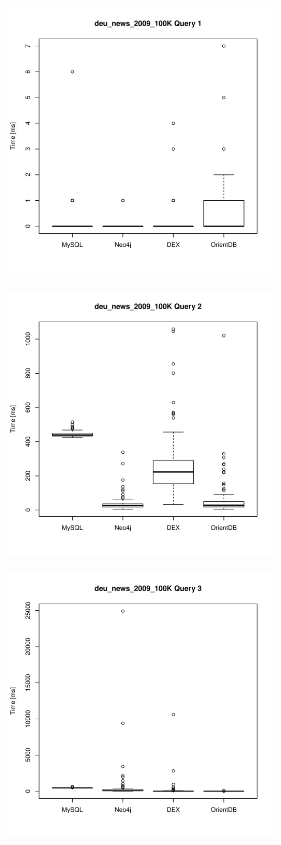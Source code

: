 \documentclass[11pt, a4paper, oneside]{article} %
\begin{document}
\begin{appendix}
\begin{landscape}
\begin{figure}[ht]
		\begin{minipage}[hbt]{6.5cm}
			\centering
			\includegraphics[width=7cm]{../results/cold caches/images/100K_query1_boxplot}
			\label{fig:100K_query1_boxplot}
		\end{minipage}
		\hfill
		\begin{minipage}[hbt]{6.5cm}
			\centering
			\includegraphics[width=7cm]{../results/cold caches/images/100K_query2_boxplot}
			\label{fig:100K_query2_boxplot}
		\end{minipage}
		\hfill
		\begin{minipage}[hbt]{6.5cm}
			\centering
			\includegraphics[width=7cm]{../results/cold caches/images/100K_query3_boxplot}
			\label{fig:100K_query3_boxplot}
		\end{minipage}
	\end{figure}
\end{landscape} 


\end{appendix}
\end{document}
